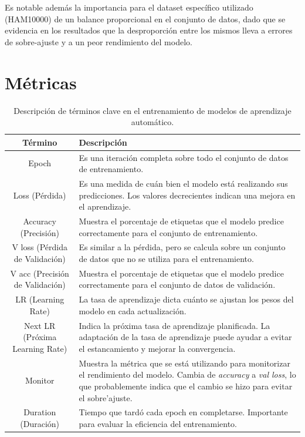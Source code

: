 Es notable además la importancia para el dataset específico utilizado (HAM10000) de un balance proporcional en el conjunto de datos, dado que se evidencia en los resultados que la desproporción entre los mismos lleva a errores de sobre-ajuste y a un peor rendimiento del modelo.

\section*{Métricas}

\begin{table}[ht]
    \centering
    \small
    \begin{tabular}{|c|p{10cm}|}
    \hline
    \textbf{Término} & \textbf{Descripción} \\
    \hline
    Epoch & Es una iteración completa sobre todo el conjunto de datos de entrenamiento. \\
    \hline
    Loss (Pérdida) & Es una medida de cuán bien el modelo está realizando sus predicciones. Los valores decrecientes indican una mejora en el aprendizaje. \\
    \hline
    Accuracy (Precisión) & Muestra el porcentaje de etiquetas que el modelo predice correctamente para el conjunto de entrenamiento. \\
    \hline
    V loss (Pérdida de Validación) & Es similar a la pérdida, pero se calcula sobre un conjunto de datos que no se utiliza para el entrenamiento. \\
    \hline
    V acc (Precisión de Validación) & Muestra el porcentaje de etiquetas que el modelo predice correctamente para el conjunto de datos de validación. \\
    \hline
    LR (Learning Rate) & La tasa de aprendizaje dicta cuánto se ajustan los pesos del modelo en cada actualización. \\
    \hline
    Next LR (Próxima Learning Rate) & Indica la próxima tasa de aprendizaje planificada. La adaptación de la tasa de aprendizaje puede ayudar a evitar el estancamiento y mejorar la convergencia. \\
    \hline
    Monitor & Muestra la métrica que se está utilizando para monitorizar el rendimiento del modelo. Cambia de \textit{accuracy} a \textit{val loss}, lo que probablemente indica que el cambio se hizo para evitar el sobre'ajuste. \\
    \hline
    Duration (Duración) & Tiempo que tardó cada epoch en completarse. Importante para evaluar la eficiencia del entrenamiento. \\
    \hline
    \end{tabular}
    \caption{Descripción de términos clave en el entrenamiento de modelos de aprendizaje automático.}
    \label{table:terminology}
    \end{table}